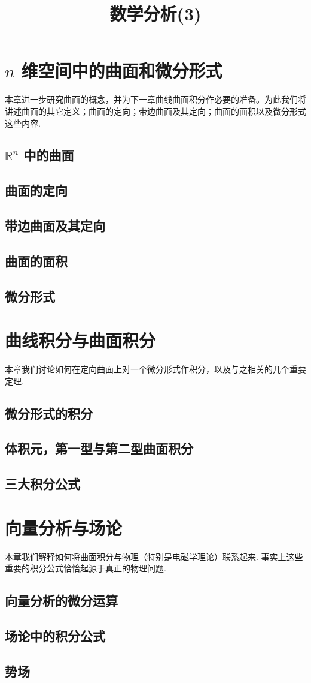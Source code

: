 \documentclass{ctexrep}
\title{数学分析(3)}
\theoremstyle{examplestyle}
\theoremstyle{hintstyle}
\newcommand{\mychapter}[1]{{\color{mydarkblue}\chapter{#1}}}
\newcommand{\mysection}[1]{{\color{mydarkblue}\section{#1}}}
\newcommand{\RR}{\mathbb{R}}
\begin{document}
\maketitle
\tableofcontents

\setcounter{chapter}{11}
\mychapter{$n$ 维空间中的曲面和微分形式}

本章进一步研究曲面的概念，并为下一章曲线曲面积分作必要的准备。为此我们将讲述曲面的其它定义；曲面的定向；带边曲面及其定向；曲面的面积以及微分形式这些内容.

\mysection{$\RR^n$ 中的曲面}



\mysection{曲面的定向}



\mysection{带边曲面及其定向}



\mysection{曲面的面积}



\mysection{微分形式}



\mychapter{曲线积分与曲面积分}

本章我们讨论如何在定向曲面上对一个微分形式作积分，以及与之相关的几个重要定理.

\mysection{微分形式的积分}



\mysection{体积元，第一型与第二型曲面积分}



\mysection{三大积分公式}



\mychapter{向量分析与场论}

本章我们解释如何将曲面积分与物理（特别是电磁学理论）联系起来. 事实上这些重要的积分公式恰恰起源于真正的物理问题.

\mysection{向量分析的微分运算}



\mysection{场论中的积分公式}



\mysection{势场}


\end{document}
